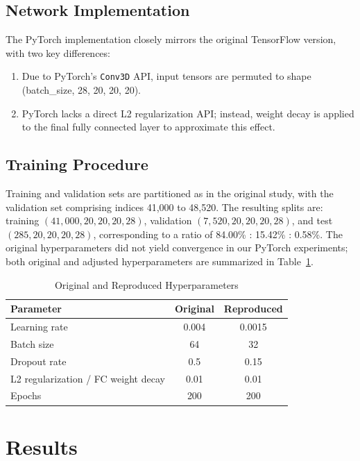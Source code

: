 \documentclass[unnumsec,webpdf,contemporary,large]{oup-authoring-template}
\theoremstyle{thmstyleone}%
\theoremstyle{thmstyletwo}%
\theoremstyle{thmstylethree}%
\begin{document}
\subsection{Network Implementation}
\vspace{0.5em}
The PyTorch implementation closely mirrors the original TensorFlow version, with two key differences:
\begin{enumerate}
    \item Due to PyTorch's \texttt{Conv3D} API, input tensors are permuted to shape (batch\_size, 28, 20, 20, 20).
    \item PyTorch lacks a direct L2 regularization API; instead, weight decay is applied to the final fully connected layer to approximate this effect.
\end{enumerate}

\subsection{Training Procedure}
\vspace{0.5em}
Training and validation sets are partitioned as in the original study, with the validation set comprising indices 41,000 to 48,520. The resulting splits are: training $(41,000, 20, 20, 20, 28)$, validation $(7,520, 20, 20, 20, 28)$, and test $(285, 20, 20, 20, 28)$, corresponding to a ratio of 84.00\% : 15.42\% : 0.58\%. The original hyperparameters did not yield convergence in our PyTorch experiments; both original and adjusted hyperparameters are summarized in Table~\ref{tab:hyperparams}.

\begin{table}[H]
\centering
\caption{Original and Reproduced Hyperparameters}
\label{tab:hyperparams}
\begin{tabular}{lcc}
\toprule
Parameter & Original & Reproduced \\
\midrule
Learning rate & 0.004 & 0.0015 \\
Batch size & 64 & 32 \\
Dropout rate & 0.5 & 0.15 \\
L2 regularization / FC weight decay & 0.01 & 0.01 \\
Epochs & 200 & 200 \\
\bottomrule
\end{tabular}
\end{table}

\section{Results}
\end{document}
